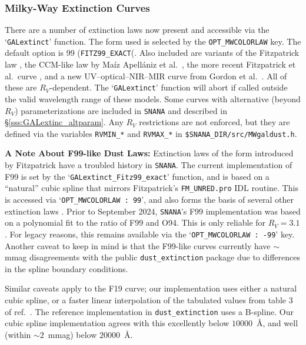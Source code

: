 \documentclass[12pt]{article}
\begin{document}
{\subsubsection{Milky-Way Extinction Curves}
\label{sss:GALextinc_curves}
There are a number of extinction laws now present and
accessible via the `\texttt{GALextinct}' function. The
form used is selected by the {\tt OPT\_MWCOLORLAW} key.
The default option is 99 ({\tt FITZ99\_EXACT}(.
Also included are variants of the Fitzpatrick law 
\cite{Fitzpatrick1999, Fitzpatrick2004}, the CCM-like law
by Ma\'{i}z Apell\'{a}niz et al.~\cite{MaizApellaniz2014},
the more recent Fitzpatrick et al.\ curve \cite{Fitzpatrick2019},
and a new UV--optical--NIR--MIR
curve from Gordon et al.~\cite{Gordon2023}. All of these are $R_V$-dependent.
The `\texttt{GALextinct}' function will abort if called 
outside the valid wavelength range of these models. Some curves with
alternative (beyond $R_V$) parameterizations are included
in \texttt{SNANA} and described in \S\ref{sss:GALextinc_altparam}.
Any $R_V$ restrictions are not enforced, but they are defined via 
the variables \verb!RVMIN_*! and \verb!RVMAX_*! in 
\verb!$SNANA_DIR/src/MWgaldust.h!.

\textbf{A Note About F99-like Dust Laws:} Extinction laws of the
form introduced by Fitzpatrick \cite{Fitzpatrick1999} have a troubled history in
\texttt{SNANA}. The current implementation of F99 is set by the
`\verb!GALextinct_Fitz99_exact!' function, and is based on a ``natural''
cubic spline that mirrors Fitzpatrick's \verb!FM_UNRED.pro! IDL routine.
This is accessed via `\verb!OPT_MWCOLORLAW : 99!', and also forms the
basis of several other extinction laws 
\cite{Fitzpatrick2004, Gordon2016, Gordon2003}.
Prior to September 2024, \texttt{SNANA}'s F99 implementation was based
on a polynomial fit to the ratio of F99 and O94. This is only reliable for 
$R_V=3.1$. For legacy reasons, this remains available via the 
`\verb!OPT_MWCOLORLAW : -99!' key. Another caveat to keep in mind is that
the F99-like curves currently have $\sim$mmag disagreements with the public
\verb!dust_extinction! package \cite{Gordon2024} due to differences in
the spline boundary conditions. 

Similar caveats apply to the 
F19 \cite{Fitzpatrick2019} curve; our implementation
uses either a natural cubic spline, or a faster linear interpolation of
the tabulated values from table 3 of ref.\ \cite{Fitzpatrick2019}. The 
reference implementation in \verb!dust_extinction! uses a B-spline. Our
cubic spline implementation agrees with this excellently below $10000$~\AA, 
and well (within $\sim2$~mmag) below $20000$~\AA.

}
\end{document}
